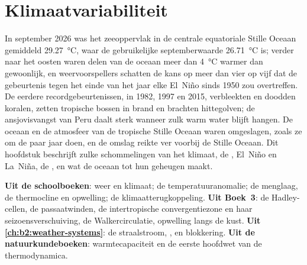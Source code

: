 \chapter{Klimaatvariabiliteit}\label{ch:b2:climate-variability}

In september 2026 was het zeeoppervlak in de centrale equatoriale Stille Oceaan gemiddeld \qty{29.27}{\celsius},
waar de gebruikelijke septemberwaarde \qty{26.71}{\celsius} is; verder naar het oosten waren delen van de oceaan
meer dan \qty{4}{\celsius} warmer dan gewoonlijk, en weervoorspellers schatten de kans op meer dan vier op vijf
dat de gebeurtenis tegen het einde van het jaar elke El~Niño sinds 1950 zou overtreffen. De eerdere
recordgebeurtenissen, in 1982, 1997 en 2015, verbleekten en doodden koralen, zetten tropische bossen in brand
en brachten hittegolven; de ansjovisvangst van Peru daalt sterk wanneer zulk warm water blijft hangen. De
oceaan en de atmosfeer van de tropische Stille Oceaan waren omgeslagen, zoals ze om de paar jaar doen, en de
omslag reikte ver voorbij de Stille Oceaan. Dit
hoofdstuk beschrijft zulke schommelingen van het klimaat, de , El~Niño en La~Niña, de , en wat de oceaan tot hun geheugen maakt.

\begin{recall}
\textbf{Uit de schoolboeken}: weer en klimaat; de temperatuuranomalie; de menglaag,
de thermocline en opwelling; de klimaatterugkoppeling. \textbf{Uit Boek~3}: de
Hadley-cellen, de passaatwinden, de intertropische convergentiezone en haar seizoensverschuiving, de
Walkercirculatie, opwelling langs de kust. \textbf{Uit \cref{ch:b2:weather-systems}}: de straalstroom,
,  en blokkering. \textbf{Uit de natuurkundeboeken}: warmtecapaciteit
en de eerste hoofdwet van de thermodynamica.
\end{recall}

